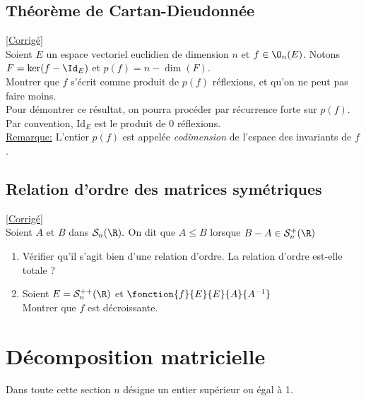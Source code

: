 \documentclass[8pt]{book}
\begin{document}
\section{Théorème de Cartan-Dieudonnée }
\label{Théorème de Cartan-Dieudonnée}
\textcolor{blue}{\hyperref[Théorème de Cartan-Dieudonnée corrigé]{[Corrigé]}}\\
Soient $E$ un espace vectoriel euclidien de dimension $n$ et $f\in \O_n(E)$.
Notons $F=\ker(f-\Id_E)$ et $p(f)=n-\dim(F)$.
\\Montrer que $f$ s'écrit comme produit de $p(f)$ réflexions, et qu'on ne peut pas faire moins.
\\Pour démontrer ce résultat, on pourra procéder par récurrence forte sur $p(f)$.
\\Par convention, Id$_E$ est le produit de $0$ réflexions.
\\\underline{Remarque:} L'entier $p(f)$ est appelée \textit{codimension} de l'espace des invariants de $f$.

\section{Relation d'ordre des matrices symétriques}
\label{Relation d'ordre des matrices symétriques}
\textcolor{blue}{\hyperref[Relation d'ordre des matrices symétriques corrigé]{[Corrigé]}}\\
Soient $A$ et $B$ dans $\mathcal{S}_n(\R).$ On dit que $A\leq B$ lorsque $B-A\in\mathcal{S}_n^+(\R)$
\begin{enumerate}
	\item Vérifier qu'il s'agit bien d'une relation d'ordre. La relation d'ordre est-elle totale ?
	\item Soient $E=\mathcal{S}_n^{++}(\R)$ et $\fonction{f}{E}{E}{A}{A^{-1}}$
	\\ Montrer que $f$ est décroissante.
\end{enumerate}

\chapter{Décomposition matricielle}
Dans toute cette section $n$ désigne un entier supérieur ou égal à 1.\\
\end{document}

